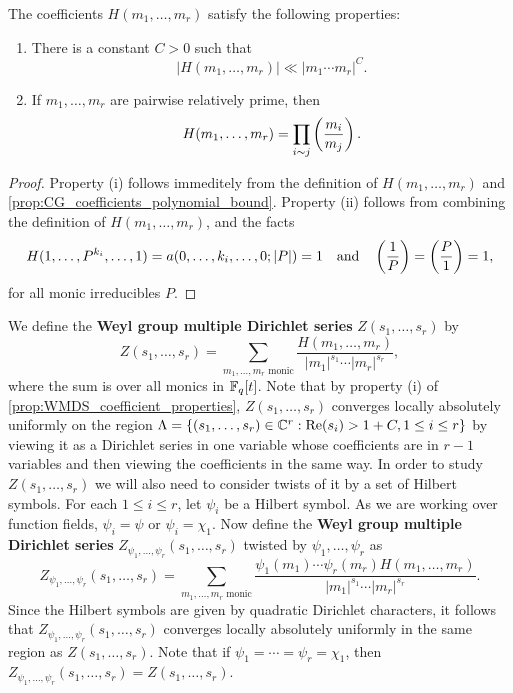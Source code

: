     \begin{proposition}\label{prop:WMDS_coefficient_properties}
        The coefficients $H(m_{1},\ldots,m_{r})$ satisfy the following properties:
        \begin{enumerate}[label=(\roman*)]
            \item There is a constant $C > 0$ such that
            \[
                |H(m_{1},\ldots,m_{r})| \ll |m_{1} \cdots m_{r}|^{C}.
            \]
            \item If $m_{1},\ldots,m_{r}$ are pairwise relatively prime, then
            \[
                H(m_{1},\ldots,m_{r}) = \prod_{\substack{i \sim j}}\left(\frac{m_{i}}{m_{j}}\right).
            \]
        \end{enumerate}
    \end{proposition}
    \begin{proof}
        Property (i) follows immeditely from the definition of $H(m_{1},\ldots,m_{r})$ and \cref{prop:CG_coefficients_polynomial_bound}. Property (ii) follows from combining the definition of $H(m_{1},\ldots,m_{r})$, and the facts
        \[
            H(1,\ldots,P^{k_{i}},\ldots,1) = a(0,\ldots,k_{i},\ldots,0;|P|) = 1 \quad \text{and} \quad \left(\frac{1}{P}\right) = \left(\frac{P}{1}\right) = 1,
        \]
        for all monic irreducibles $P$. 
    \end{proof}

    We define the \textbf{Weyl group multiple Dirichlet series} $Z(s_{1},\ldots,s_{r})$ by
    \[
        Z(s_{1},\ldots,s_{r}) = \sum_{\text{$m_{1},\ldots,m_{r}$ monic}}\frac{H(m_{1},\ldots,m_{r})}{|m_{1}|^{s_{1}} \cdots |m_{r}|^{s_{r}}},
    \]
    where the sum is over all monics in $\mathbb{F}_{q}[t]$. Note that by property (i) of \cref{prop:WMDS_coefficient_properties}, $Z(s_{1},\ldots,s_{r})$ converges locally absolutely uniformly on the region $\Lambda = \{(s_{1},\ldots,s_{r}) \in \mathbb{C}^{r}:\mathrm{Re}(s_{i}) > 1+C, 1 \le i \le r\}$ by viewing it as a Dirichlet series in one variable whose coefficients are in $r-1$ variables and then viewing the coefficients in the same way. In order to study $Z(s_{1},\ldots,s_{r})$ we will also need to consider twists of it by a set of Hilbert symbols. For each $1 \le i \le r$, let $\psi_{i}$ be a Hilbert symbol. As we are working over function fields, $\psi_{i} = \psi$ or $\psi_{i} = \chi_{1}$. Now define the \textbf{Weyl group multiple Dirichlet series} $Z_{\psi_{1},\ldots,\psi_{r}}(s_{1},\ldots,s_{r})$ twisted by $\psi_{1},\ldots,\psi_{r}$ as
    \[
        Z_{\psi_{1},\ldots,\psi_{r}}(s_{1},\ldots,s_{r}) = \sum_{\text{$m_{1},\ldots,m_{r}$ monic}}\frac{\psi_{1}(m_{1}) \cdots \psi_{r}(m_{r})H(m_{1},\ldots,m_{r})}{|m_{1}|^{s_{1}} \cdots |m_{r}|^{s_{r}}}.
    \]
    Since the Hilbert symbols are given by quadratic Dirichlet characters, it follows that $Z_{\psi_{1},\ldots,\psi_{r}}(s_{1},\ldots,s_{r})$ converges locally absolutely uniformly in the same region as $Z(s_{1},\ldots,s_{r})$. Note that if $\psi_{1} = \cdots = \psi_{r} = \chi_{1}$, then $Z_{\psi_{1},\ldots,\psi_{r}}(s_{1},\ldots,s_{r}) = Z(s_{1},\ldots,s_{r})$.

